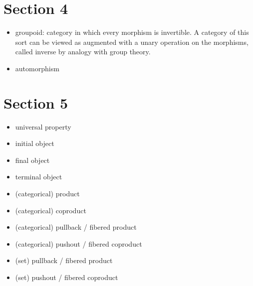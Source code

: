 \section*{Section 4}

\begin{itemize}
	\item groupoid: category in which every morphism is invertible. A category of this sort can be viewed as augmented with a unary operation on the morphisms, called inverse by analogy with group theory.
	\item automorphism
\end{itemize}

\section*{Section 5}

\begin{itemize}
	\item universal property
	\item initial object
	\item final object
	\item terminal object
	\item (categorical) product
	\item (categorical) coproduct
	\item (categorical) pullback / fibered product
	\item (categorical) pushout / fibered coproduct
	\item (set) pullback / fibered product
	\item (set) pushout / fibered coproduct
\end{itemize}
